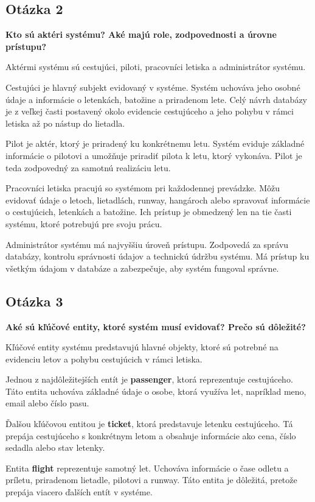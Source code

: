 \documentclass[11pt, a4paper]{article}
\begin{document}
\subsection*{Otázka 2}
\textbf{Kto sú aktéri systému? Aké majú role, zodpovednosti a úrovne prístupu?}

Aktérmi systému sú cestujúci, piloti, pracovníci letiska a administrátor systému.

Cestujúci je hlavný subjekt evidovaný v systéme. Systém uchováva jeho osobné
údaje a informácie o letenkách, batožine a priradenom lete. Celý návrh databázy
je z veľkej časti postavený okolo evidencie cestujúceho a jeho pohybu v rámci
letiska až po nástup do lietadla.

Pilot je aktér, ktorý je priradený ku konkrétnemu letu. Systém eviduje základné
informácie o pilotovi a umožňuje priradiť pilota k letu, ktorý vykonáva. Pilot
je teda zodpovedný za samotnú realizáciu letu.

Pracovníci letiska pracujú so systémom pri každodennej prevádzke. Môžu evidovať
údaje o letoch, lietadlách, runway, hangároch alebo spravovať informácie o
cestujúcich, letenkách a batožine. Ich prístup je obmedzený len na tie časti
systému, ktoré potrebujú pre svoju prácu.

Administrátor systému má najvyššiu úroveň prístupu. Zodpovedá za správu
databázy, kontrolu správnosti údajov a technickú údržbu systému. Má prístup ku
všetkým údajom v databáze a zabezpečuje, aby systém fungoval správne.

\subsection*{Otázka 3}
\textbf{Aké sú kľúčové entity, ktoré systém musí evidovať? Prečo sú dôležité?}

Kľúčové entity systému predstavujú hlavné objekty, ktoré sú potrebné na
evidenciu letov a pohybu cestujúcich v rámci letiska.
\newline

Jednou z najdôležitejších entít je \textbf{passenger}, ktorá reprezentuje
cestujúceho. Táto entita uchováva základné údaje o osobe, ktorá využíva let,
napríklad meno, email alebo číslo pasu.

Ďalšou kľúčovou entitou je \textbf{ticket}, ktorá predstavuje letenku
cestujúceho. Tá prepája cestujúceho s konkrétnym letom a obsahuje informácie
ako cena, číslo sedadla alebo stav letenky.

Entita \textbf{flight} reprezentuje samotný let. Uchováva informácie o čase
odletu a príletu, priradenom lietadle, pilotovi a runway. Táto entita je
dôležitá, pretože prepája viacero ďalších entít v systéme.
\end{document}
